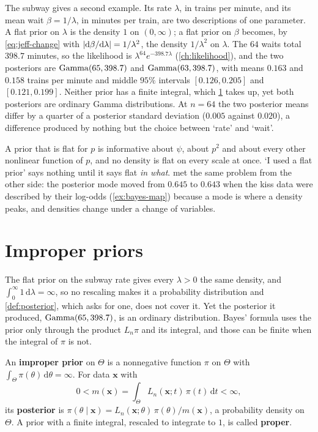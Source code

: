 The subway gives a second example.
Its rate $\lambda$, in trains per minute, and its mean wait $\beta = 1/\lambda$, in minutes per train, are two descriptions of one parameter.
A flat prior on $\lambda$ is the density $1$ on $(0, \infty)$; a flat prior on $\beta$ becomes, by \cref{eq:jeff-change} with $\lvert\mathrm{d}\beta/\mathrm{d}\lambda\rvert = 1/\lambda^2$, the density $1/\lambda^2$ on $\lambda$.
The $64$ waits total $398.7$ minutes, so the likelihood is $\lambda^{64}e^{-398.7\lambda}$ (\cref{ch:likelihood}), and the two posteriors are $\mathrm{Gamma}(65, 398.7)$ and $\mathrm{Gamma}(63, 398.7)$, with means $0.163$ and $0.158$ trains per minute and middle $95\%$ intervals $[0.126, 0.205]$ and $[0.121, 0.199]$.
Neither prior has a finite integral, which \cref{sec:jeff-improper} takes up, yet both posteriors are ordinary Gamma distributions.
At $n = 64$ the two posterior means differ by a quarter of a posterior standard deviation ($0.005$ against $0.020$), a difference produced by nothing but the choice between `rate' and `wait'.

\begin{pitfall}
A prior that is flat for $p$ is informative about $\psi$, about $p^2$ and about every other nonlinear function of $p$, and no density is flat on every scale at once.
`I used a flat prior' says nothing until it says flat \textit{in what}.
 met the same problem from the other side: the posterior mode moved from $0.645$ to $0.643$ when the kiss data were described by their log-odds (\cref{ex:bayes-map}) because a mode is where a density peaks, and densities change under a change of variables.
\end{pitfall}

\section{Improper priors}
\label{sec:jeff-improper}

The flat prior on the subway rate gives every $\lambda > 0$ the same density, and $\int_0^\infty 1\,\mathrm{d}\lambda = \infty$, so no rescaling makes it a probability distribution and \cref{def:posterior}, which asks for one, does not cover it.
Yet the posterior it produced, $\mathrm{Gamma}(65, 398.7)$, is an ordinary distribution.
Bayes' formula uses the prior only through the product $L_n\pi$ and its integral, and those can be finite when the integral of $\pi$ is not.

\begin{definition}
\label{def:improper-prior}
An \textbf{improper prior} on $\Theta$ is a nonnegative function $\pi$ on $\Theta$ with $\int_\Theta \pi(\theta)\,\mathrm{d}\theta = \infty$. For data $\mathbf{x}$ with
\[
0 < m(\mathbf{x}) = \int_\Theta L_n(\mathbf{x}; t)\,\pi(t)\,\mathrm{d}t < \infty,
\]
its \textbf{posterior} is $\pi(\theta \mid \mathbf{x}) = L_n(\mathbf{x}; \theta)\,\pi(\theta)/m(\mathbf{x})$, a probability density on $\Theta$. A prior with a finite integral, rescaled to integrate to $1$, is called \textbf{proper}.
\end{definition}

